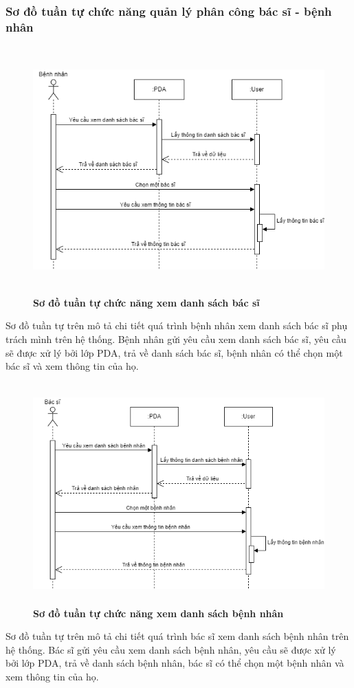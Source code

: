 \subsubsection{Sơ đồ tuần tự chức năng quản lý phân công bác sĩ - bệnh nhân}
\begin{figure}[H]
  \centering
  \includegraphics[width=13cm,height=9.5cm]{Images/sequence/sequence_manage_doctor.png}
  \caption[Sơ đồ tuần tự chức năng xem danh sách bác sĩ]{\bfseries \fontsize{12pt}{0pt}
  \selectfont Sơ đồ tuần tự chức năng xem danh sách bác sĩ}
  \label{sequence_manage_doctor} %
\end{figure}
Sơ đồ tuần tự trên mô tả chi tiết quá trình bệnh nhân xem danh sách bác sĩ phụ trách mình trên hệ thống. Bệnh nhân gửi yêu cầu xem danh sách bác sĩ, 
yêu cầu sẽ được xử lý bởi lớp PDA, trả về danh sách bác sĩ, bệnh nhân có thể chọn một bác sĩ và xem thông tin của họ. 
\begin{figure}[H]
  \centering
  \includegraphics[width=12cm,height=8.5cm]{Images/sequence/sequence_manage_patient.png}
  \caption[Sơ đồ tuần tự chức năng xem danh sách bệnh nhân]{\bfseries \fontsize{12pt}{0pt}
  \selectfont Sơ đồ tuần tự chức năng xem danh sách bệnh nhân}
  \label{sequence_manage_patient} %
\end{figure}
Sơ đồ tuần tự trên mô tả chi tiết quá trình bác sĩ xem danh sách bệnh nhân trên hệ thống. Bác sĩ gửi yêu cầu xem danh sách bệnh nhân, 
yêu cầu sẽ được xử lý bởi lớp PDA, trả về danh sách bệnh nhân, bác sĩ có thể chọn một bệnh nhân và xem thông tin của họ. 

